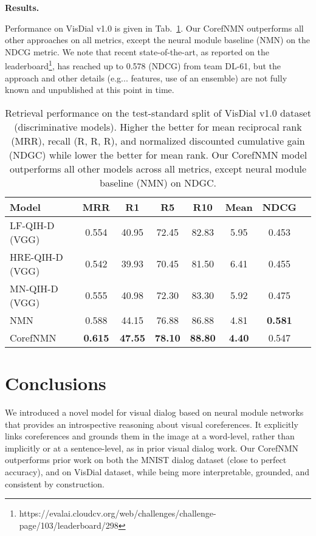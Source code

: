 \documentclass[runningheads]{llncs}
\makeatletter
\def\adl@drawiv#1#2#3{\hskip.5\tabcolsep
        \xleaders#3{#2.5\@tempdimb #1{1}#2.5\@tempdimb}#2\z@ plus1fil minus1fil\relax
        \hskip.5\tabcolsep}
\newcommand{\cdashlinelr}[1]{\noalign{\vskip\aboverulesep
           \global\let\@dashdrawstore\adl@draw
           \global\let\adl@draw\adl@drawiv}
  \cdashline{#1}
  \noalign{\global\let\adl@draw\@dashdrawstore
           \vskip\belowrulesep}}
\DeclareRobustCommand\onedot{\futurelet\@let@token\@onedot}
\def\@onedot{\ifx\@let@token.\else.\null\fi\xspace}
\def\eg{e.g\onedot} \def\Eg{E.g\onedot}
\newcommand{\nmn}{CorefNMN\xspace}
\newcommand{\reftab}[1]{Tab.~\ref{#1}}
\makeatother
\begin{document}
\noindent
\textbf{Results.}

Performance on VisDial v1.0 is given in \reftab{tab:visdial_v1_result_table}.
Our \nmn{} outperforms all other approaches on all metrics, except the neural module
baseline (NMN) on the NDCG metric.
We note that recent state-of-the-art, as reported on the leaderboard\footnote{https://evalai.cloudcv.org/web/challenges/challenge-page/103/leaderboard/298}, 
has reached up to 0.578 (NDCG) from team DL-61, but the approach and 
other details (\eg. features, use of an ensemble) are not fully known and unpublished at 
this point in time.

\begin{table}[t]
	\centering
	\setlength{\tabcolsep}{6pt}
    \begin{tabular}{lccccccc}
	\toprule
	\textbf{Model} & \textbf{MRR} & \textbf{R1} & \textbf{R5}
    				& \textbf{R10} & \textbf{Mean} & \textbf{NDCG}\\
	\midrule
	LF-QIH-D \cite{visdial} (VGG) & 0.554 & 40.95 & 72.45 & 82.83 & 5.95 & 0.453 \\
    HRE-QIH-D \cite{visdial} (VGG) & 0.542 & 39.93 & 70.45 & 81.50 & 6.41 & 0.455\\
    MN-QIH-D \cite{visdial} (VGG) & 0.555 & 40.98 & 72.30 & 83.30 & 5.92 & 0.475 \\
	\cdashlinelr{1-7}
NMN \cite{hu2017learning} & 0.588 & 44.15 & 76.88 & 86.88 & 4.81 & \textbf{0.581} \\
	\cdashlinelr{1-7}
    \nmn & \textbf{0.615} & \textbf{47.55} & \textbf{78.10} & \textbf{88.80} & \textbf{4.40} & 0.547 \\
    \bottomrule
	\end{tabular}
\caption{
    Retrieval performance on the test-standard split of VisDial v1.0
    dataset \cite{visdial} (discriminative models).
    Higher the better for mean reciprocal rank (MRR), recall 
    (R, R, R), and normalized discounted cumulative gain (NDGC) 
    while lower the better for mean rank.
    Our \nmn model outperforms all other models across all metrics, except neural
    module baseline (NMN) on NDGC.}
    \label{tab:visdial_v1_result_table}
\end{table}  
\section{Conclusions}
We introduced a novel model for visual dialog based on neural module networks
that provides an introspective reasoning about visual coreferences.
It explicitly links coreferences and grounds them in the 
image at a word-level, rather than implicitly or at a sentence-level, as in prior visual dialog work.
Our \nmn outperforms prior work on both the MNIST dialog dataset (close to perfect accuracy), and on VisDial dataset, while being more interpretable, grounded, and consistent by construction.
\end{document}
